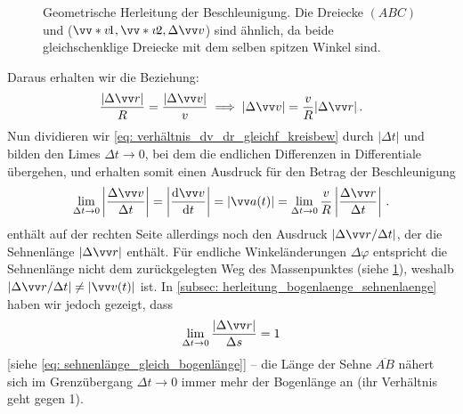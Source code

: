 \begin{figure}[tb]
{
    }
    \caption{Geometrische Herleitung der Beschleunigung. Die Dreiecke $(ABC)$ und ($\protect\ivecS{v}{1}, \protect\ivecS{v}{2}, \Delta\protect\ivec{v}$) sind ähnlich, da beide gleichschenklige Dreiecke mit dem selben spitzen Winkel sind.}\label{fig: beschleunigung_geometrisch_aehnliche_dreiecke}
\end{figure}
Daraus erhalten wir die Beziehung:
\begin{equation}\label{eq: verhältnis_dv_dr_gleichf_kreisbew}
    \frac{|\Delta \ivec{r}|}{R} = \frac{|\Delta \ivec{v}|}{v} \implies |\Delta \ivec{v}| = \frac{v}{R} |\Delta \ivec{r}| \mDot
\end{equation}
Nun dividieren wir \cref{eq: verhältnis_dv_dr_gleichf_kreisbew} durch $|\Delta t|$ und bilden den Limes $\Delta t\to 0$, bei dem die endlichen Differenzen in Differentiale übergehen, und erhalten somit einen Ausdruck für den Betrag der Beschleunigung
\begin{equation}\label{eq: betrag_beschl_gleichf_kreisbew_noch_mit_limes}
    \lim_{\Delta t\to 0}\left|\frac{\Delta \ivec{v}}{\Delta t}\right| = \left| \frac{\dd \ivec{v}}{\dd t} \right| = |\ivec{a}(t)| = \lim_{\Delta t\to 0} \frac{v}{R} \left|\frac{\Delta \ivec{r}}{\Delta t}\right| \mDot
\end{equation}
 enthält auf der rechten Seite allerdings noch den Ausdruck $|\Delta \ivec{r}/\Delta t|$, der die Sehnenlänge $|\Delta \ivec{r}|$ enthält. Für endliche Winkeländerungen $\Delta \varphi$ entspricht die Sehnenlänge nicht dem zurückgelegten Weg des Massenpunktes (siehe \cref{fig: beschleunigung_geometrisch_aehnliche_dreiecke}), weshalb $|\Delta \ivec{r}/\Delta t| \neq |\ivec{v}(t)|$ ist. In \cref{subsec: herleitung_bogenlaenge_sehnenlaenge} haben wir jedoch gezeigt, dass
\begin{equation}
    \lim_{\Delta t \to 0} \frac{|\Delta \ivec{r}|}{\Delta s} = 1
\end{equation} 
[siehe \cref{eq: sehnenlänge_gleich_bogenlänge}] -- \gDh die Länge der Sehne $\overline{AB}$ nähert sich im Grenzübergang $\Delta t \to 0$ immer mehr der Bogenlänge an (ihr Verhältnis geht gegen 1). \\

